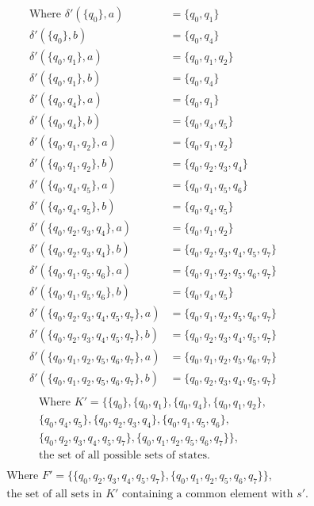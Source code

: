 \documentclass[12pt]{article}
\begin{document}
\begin{align*}
\text{Where \ } \delta'(\{q_0\}, a) &= \{q_0, q_1\} \\
\delta'(\{q_0\}, b) &= \{q_0, q_4\} \\
\delta'(\{q_0, q_1\}, a) &= \{q_0, q_1, q_2\} \\
\delta'(\{q_0, q_1\}, b) &= \{q_0, q_4\} \\
\delta'(\{q_0, q_4\}, a) &= \{q_0, q_1\} \\
\delta'(\{q_0, q_4\}, b) &= \{q_0, q_4, q_5\} \\
\delta'(\{q_0, q_1, q_2\}, a) &= \{q_0, q_1, q_2\} \\
\delta'(\{q_0, q_1, q_2\}, b) &= \{q_0, q_2, q_3, q_4\} \\
\delta'(\{q_0, q_4, q_5\}, a) &= \{q_0, q_1, q_5, q_6\} \\
\delta'(\{q_0, q_4, q_5\}, b) &= \{q_0, q_4, q_5\} \\
\delta'(\{q_0, q_2, q_3, q_4\}, a) &= \{q_0, q_1, q_2\} \\
\delta'(\{q_0, q_2, q_3, q_4\}, b) &= \{q_0, q_2, q_3, q_4, q_5, q_7\} \\
\delta'(\{q_0, q_1, q_5, q_6\}, a) &= \{q_0, q_1, q_2, q_5, q_6, q_7\} \\
\delta'(\{q_0, q_1, q_5, q_6\}, b) &= \{q_0, q_4, q_5\} \\
\delta'(\{q_0, q_2, q_3, q_4, q_5, q_7\}, a) &= \{q_0, q_1, q_2, q_5, q_6, q_7\} \\
\delta'(\{q_0, q_2, q_3, q_4, q_5, q_7\}, b) &= \{q_0, q_2, q_3, q_4, q_5, q_7\} \\
\delta'(\{q_0, q_1, q_2, q_5, q_6, q_7\}, a) &= \{q_0, q_1, q_2, q_5, q_6, q_7\} \\
\delta'(\{q_0, q_1, q_2, q_5, q_6, q_7\}, b) &= \{q_0, q_2, q_3, q_4, q_5, q_7\} \\
\end{align*}
\begin{align*}
\text{Where } K' = \{\{q_0\}, \{q_0, q_1\}, \{q_0, q_4\}, \{q_0, q_1, q_2\}, \\
\{q_0, q_4, q_5\}, \{q_0, q_2, q_3, q_4\}, \{q_0, q_1, q_5, q_6\}, \\
\{q_0, q_2, q_3, q_4, q_5, q_7\}, \{q_0, q_1, q_2, q_5, q_6, q_7\}\} \text{,} \\
\text{the set of all possible sets of states.} \\
\end{align*}
\begin{align*}
&\text{Where } F' = \{\{q_0, q_2, q_3, q_4, q_5, q_7\}, \{q_0, q_1, q_2, q_5, q_6, q_7\}\} \text{,} \\
&\text{the set of all sets in $K'$ containing a common element with $s'$.}
\end{align*}
\end{document}

